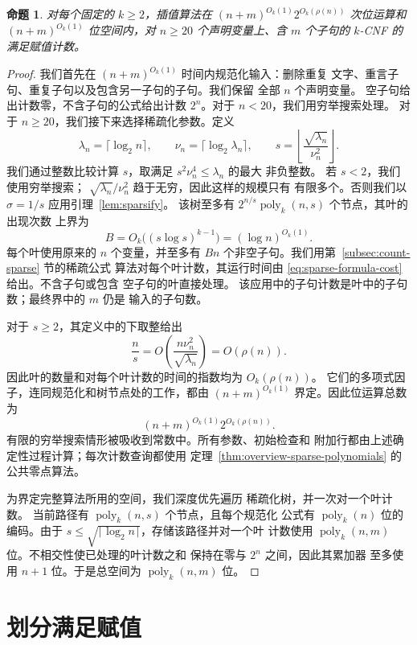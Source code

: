 \documentclass[11pt,reqno]{amsart}
\numberwithin{equation}{section}
\newtheorem{proposition}[theorem]{命题}
\theoremstyle{definition}\newtheorem{definition}[theorem]{定义}
\theoremstyle{remark}\newtheorem{remark}[theorem]{注}
\newcommand{\poly}{\operatorname{poly}}
\renewcommand{\le}{\leqslant}
\renewcommand{\ge}{\geqslant}
\begin{document}
\begin{proposition}\label{prop:interpolation-bound}
对每个固定的 $k\ge2$，插值算法在
$(n+m)^{O_k(1)}2^{O_k(\rho(n))}$ 次位运算和
$(n+m)^{O_k(1)}$ 位空间内，对 $n\ge20$ 个声明变量上、含 $m$
个子句的 $k$-CNF 的满足赋值计数。
\end{proposition}
\begin{proof}
我们首先在 $(n+m)^{O_k(1)}$ 时间内规范化输入：删除重复
文字、重言子句、重复子句以及包含另一子句的子句。我们保留
全部 $n$ 个声明变量。
空子句给出计数零，不含子句的公式给出计数 $2^n$。对于
$n<20$，我们用穷举搜索处理。
对于 $n\ge20$，我们接下来选择稀疏化参数。定义
\[
 \lambda_n=\lceil\log_2 n\rceil,\qquad
 \nu_n=\lceil\log_2\lambda_n\rceil,\qquad
 s=\left\lfloor\frac{\sqrt{\lambda_n}}{\nu_n^2}\right\rfloor.
\]
我们通过整数比较计算 $s$，取满足 $s^2\nu_n^4\le\lambda_n$ 的最大
非负整数。
若 $s<2$，我们使用穷举搜索；
$\sqrt{\lambda_n}/\nu_n^2$ 趋于无穷，因此这样的规模只有
有限多个。否则我们以 $\sigma=1/s$ 应用引理~\ref{lem:sparsify}。
该树至多有
$2^{n/s}\operatorname{poly}_k(n,s)$ 个节点，其叶的出现次数
上界为
\[
 B=O_k\bigl((s\log s)^{k-1}\bigr)=(\log n)^{O_k(1)}.
\]
每个叶使用原来的 $n$ 个变量，并至多有 $Bn$
个非空子句。我们用第~\ref{subsec:count-sparse} 节的稀疏公式
算法对每个叶计数，其运行时间由
\eqref{eq:sparse-formula-cost} 给出。不含子句或包含
空子句的叶直接处理。
该应用中的子句计数是叶中的子句数；最终界中的 $m$ 仍是
输入的子句数。

对于 $s\ge2$，其定义中的下取整给出
\[
 \frac ns=O\!\left(\frac{n\nu_n^2}{\sqrt{\lambda_n}}\right)
 =O(\rho(n)).
\]
因此叶的数量和对每个叶计数的时间的指数均为 $O_k(\rho(n))$。
它们的多项式因子，连同规范化和树节点处的工作，都由
$(n+m)^{O_k(1)}$ 界定。因此位运算总数为
\[
 (n+m)^{O_k(1)}2^{O_k(\rho(n))}.
\]
有限的穷举搜索情形被吸收到常数中。所有参数、初始检查和
附加行都由上述确定性过程计算；每次计数查询都使用
定理~\ref{thm:overview-sparse-polynomials} 的公共零点算法。

为界定完整算法所用的空间，我们深度优先遍历
稀疏化树，并一次对一个叶计数。
当前路径有 $\poly_k(n,s)$ 个节点，且每个规范化
公式有 $\poly_k(n)$ 位的编码。由于
$s\le\sqrt{\lceil\log_2 n\rceil}$，存储该路径并对一个叶
计数使用 $\poly_k(n,m)$ 位。不相交性使已处理的叶计数之和
保持在零与 $2^n$ 之间，因此其累加器
至多使用 $n+1$ 位。于是总空间为 $\poly_k(n,m)$ 位。
\end{proof}

\appendix

\section{划分满足赋值}\label{app:sparsify}
\end{document}
